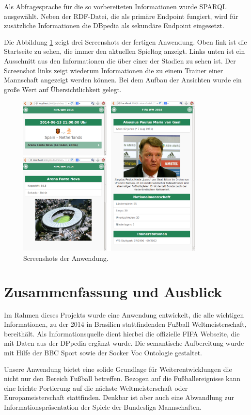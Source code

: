 \documentclass[runningheads,a4paper]{llncs}
\begin{document}
Als Abfragesprache für die so vorbereiteten Informationen wurde SPARQL ausgewählt. Neben der RDF-Datei, die als primäre Endpoint fungiert, wird für zusätzliche Informationen die DBpedia als sekundäre Endpoint eingesetzt. 

Die Abbildung \ref{fig:screenshots} zeigt drei Screenshots der fertigen Anwendung. Oben link ist die Startseite zu sehen, die immer den aktuellen Spieltag anzeigt. Links unten ist ein Ausschnitt aus den Informationen die über einer der Stadien zu sehen ist. Der Screenshot links zeigt wiederum Informationen die zu einem Trainer einer Mannschaft angezeigt werden können. Bei dem Aufbau der Ansichten wurde ein große Wert auf Übersichtlichkeit gelegt.   
\begin{figure}
\centering
\includegraphics[height=8.2cm]{screenshots}
\caption{Screenshots der Anwendung.}
\label{fig:screenshots}
\end{figure}

\newpage
\section{Zusammenfassung und Ausblick}

Im Rahmen dieses Projekts wurde eine Anwendung entwickelt, die alle wichtigen Informationen, zu der 2014 in Brasilien stattfindenden Fußball Weltmeisterschaft, bereithält. Als Informationsquelle dient hierbei die offizielle FIFA Webseite, die mit Daten aus der DPpedia ergänzt wurde. Die semantische Aufbereitung wurde mit Hilfe der BBC Sport sowie der Socker Voc Ontologie gestaltet.  

Unsere Anwendung bietet eine solide Grundlage für Weiterentwicklungen die nicht nur den Bereich Fußball betreffen. Bezogen auf die Fußballereignisse kann eine leichte Portierung auf die nächste Weltmeisterschaft oder Europameisterschaft stattfinden. Denkbar ist aber auch eine Abwandlung zur Informationspräsentation der Spiele der Bundesliga Mannschaften. 
\end{document}
